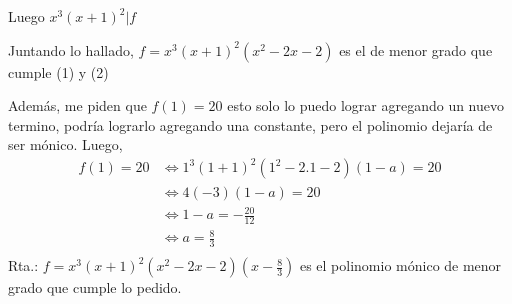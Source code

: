 Luego $ x^3(x+1)^2 | f $

Juntando lo hallado, $ f = x^3(x+1)^2(x^2 - 2x - 2) $ es el de menor grado que cumple (1) y (2)

Además, me piden que $ f(1) = 20 $ esto solo lo puedo lograr agregando un nuevo termino, podría lograrlo agregando una constante, pero el polinomio dejaría de ser mónico. Luego,
\begin{align*}
    f(1) = 20 &\iff 1^3(1+1)^2(1^2 - 2.1 - 2)(1-a) = 20 \\
    &\iff 4(-3)(1-a) = 20 \\
    &\iff 1-a = -\frac{20}{12} \\
    &\iff a = \frac{8}{3} \\
\end{align*}
Rta.: $ f = x^3(x+1)^2(x^2-2x-2)(x-\frac{8}{3}) $ es el polinomio mónico de menor grado que cumple lo pedido.


